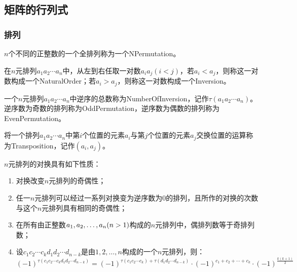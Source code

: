 \subsection{矩阵的行列式}
\subsubsection{排列}
\begin{definition}
	$n$个不同的正整数的一个全排列称为一个\gls{NPermutation}。
\end{definition}
\begin{definition}
	在$n$元排列$a_1a_2\cdots a_n$中，从左到右任取一对数$a_ia_j(i<j)$，若$a_i<a_j$，则称这一对数构成一个\gls{NaturalOrder}；若$a_i>a_j$，则称这一对数构成一个\gls{Inversion}。
\end{definition}
\begin{definition}
	一个$n$元排列$a_1a_2\cdots a_n$中逆序的总数称为\gls{NumberOfInversion}，记作$\tau(a_1a_2\cdots a_n)$。逆序数为奇数的排列称为\gls{OddPermutation}，逆序数为偶数的排列称为\gls{EvenPermutation}。
\end{definition}
\begin{definition}
	将一个排列$a_1a_2\cdots a_n$中第$i$个位置的元素$a_i$与第$j$个位置的元素$a_j$交换位置的运算称为\gls{Transposition}，记作$(a_i,a_j)$。
\end{definition}
\begin{property}\label{prop:Transposition}
	$n$元排列的对换具有如下性质：
	\begin{enumerate}
		\item 对换改变$n$元排列的奇偶性；
		\item 任一$n$元排列可以经过一系列对换变为逆序数为$0$的排列，且所作的对换的次数与这个$n$元排列具有相同的奇偶性；
		\item 在所有由正整数$a_1, a_2, \dots, a_{n}(n>1)$构成的$n$元排列中，偶排列数等于奇排列数；
		\item 设$c_1c_2\cdots c_kd_1d_2\cdots d_{n-k}$是由$1,2,\dots,n$构成的一个$n$元排列，则：
		\begin{equation*}
			(-1)^{\tau(c_1c_2\cdots c_kd_1d_2\cdots d_{n-k})}=(-1)^{\tau(c_1c_2\cdots c_k)+\tau(d_1d_2\cdots d_{n-k})}\cdot(-1)^{c_1+c_2+\cdots+c_k}\cdot(-1)^{\frac{k(k+1)}{2}}
		\end{equation*}
	\end{enumerate}
\end{property}
